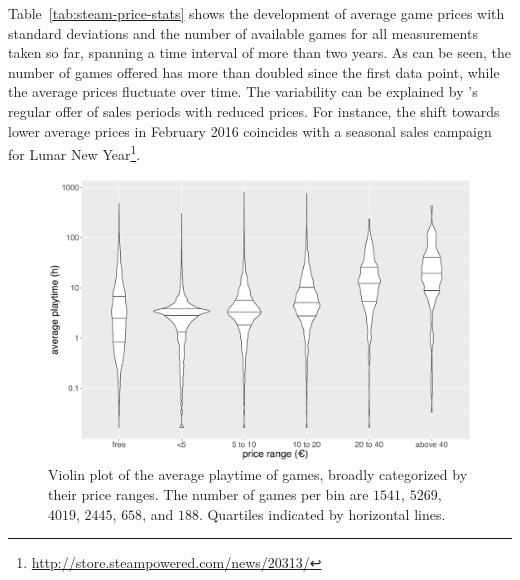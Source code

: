 Table~\ref{tab:steam-price-stats} shows the development of average
\steam game prices with standard deviations and the number of available
games for all \steam measurements taken so far, spanning a time interval
of more than two years. As can be seen, the number of games offered
has more than doubled since the first data point, while the average
prices fluctuate over time.
The variability can be explained by \steam's regular offer of sales
periods with reduced prices. For instance, the shift towards lower
average
prices in February 2016 coincides with a seasonal sales campaign
for Lunar New Year\footnote{\url{http://store.steampowered.com/news/20313/}}.




\begin{figure}[!t]
	\centering
	\includegraphics[width=1.0\columnwidth]{images/steam-cost-vs-playtime-non-sale.pdf}
	\caption{Violin plot of the average playtime of \steam games, broadly categorized by their price ranges. The number of games per bin are $1541$, $5269$, $4019$, $2445$, $658$, and $188$. Quartiles indicated by horizontal lines.}
\label{fig:steam-cost-vs-playtime-violin}
\end{figure}

